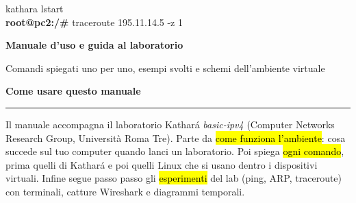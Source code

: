 \vspace*{15.2cm}
\begin{center}
\begin{tcolorbox}[enhanced,width=.8\linewidth,colback=termbg,colframe=termbg,arc=6pt,boxrule=0pt,halign=flush left,left=14pt,top=8pt,bottom=8pt]
\ttfamily\small{} kathara lstart\\[2pt]
{\color{termprompt}\bfseries root@pc2:/\#} traceroute 195.11.14.5 -z 1
\end{tcolorbox}
\vspace{.9cm}

{\headfont\large\color{navy}\bfseries Manuale d'uso e guida al laboratorio\par}
\vspace{2pt}
{\headfont\color{grigio}Comandi spiegati uno per uno, esempi svolti e schemi dell'ambiente virtuale\par}
\vspace{1.0cm}
\end{center}

\clearpage
\thispagestyle{plain}
{\headfont\bfseries\Huge\color{navy}Come usare questo manuale\par}
\vspace{4pt}
{\color{teal}\rule{3cm}{2.5pt}}
\vspace{8pt}

Il manuale accompagna il laboratorio Kathará \emph{basic-ipv4} (Computer Networks Research Group, Università Roma Tre). Parte da \hl{come funziona l'ambiente}: cosa succede sul tuo computer quando lanci un laboratorio. Poi spiega \hl{ogni comando}, prima quelli di Kathará e poi quelli Linux che si usano dentro i dispositivi virtuali. Infine segue passo passo gli \hl{esperimenti} del lab (ping, ARP, traceroute) con terminali, catture Wireshark e diagrammi temporali.

